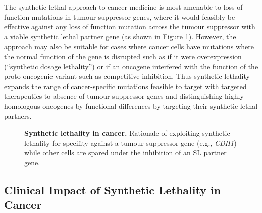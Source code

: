 The synthetic lethal approach to cancer medicine is most amenable to loss of function mutations in tumour suppressor genes, where it would feasibly be effective against any loss of function mutation across the tumour suppressor with a viable synthetic lethal partner gene (as shown in Figure \ref{fig:SL_Concept}). However, the approach may also be suitable for cases where cancer cells have mutations where the normal function of the gene is disrupted such as if it were overexpression (``synthetic dosage lethality'') or if an oncogene interfered with the function of the proto-oncogenic variant such as competitive inhibition. Thus synthetic lethality expands the range of cancer-specific mutations feasible to target with targeted therapeutics to absence of tumour suppressor genes and distinguishing highly homologous oncogenes by functional differences by targeting their synthetic lethal partners. 

\begin{figure}[!ht]
   \centering
      \caption{\textbf{Synthetic lethality in cancer.} Rationale of exploiting synthetic lethality for specifity against a tumour suppressor gene (e.g.,  \textit{CDH1}) while other cells are spared under the inhibition of an SL partner gene.}
\label{fig:SL_Concept}
\end{figure}

\subsection{Clinical Impact of Synthetic Lethality in Cancer}

